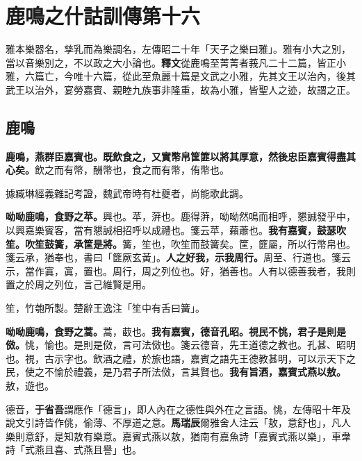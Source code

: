 \chapter{鹿鳴之什詁訓傳第十六}

\begin{quoting}雅本樂器名，孳乳而為樂調名，左傳昭二十年「天子之樂曰雅」。雅有小大之別，當以音樂別之，不以政之大小論也。\textbf{釋文}從鹿鳴至菁菁者莪凡二十二篇，皆正小雅，六篇亡，今唯十六篇，從此至魚麗十篇是文武之小雅，先其文王以治內，後其武王以治外，宴勞嘉賓、親睦九族事非隆重，故為小雅，皆聖人之迹，故謂之正。\end{quoting}

\section{鹿鳴}


\textbf{鹿鳴，燕群臣嘉賓也。既飲食之，又實幣帛筐篚以將其厚意，然後忠臣嘉賓得盡其心矣。}{\footnotesize 飲之而有幣，酬幣也，食之而有幣，侑幣也。}

\begin{quoting}據臧琳經義雜記考證，魏武帝時有杜夔者，尚能歌此調。\end{quoting}

\textbf{呦呦鹿鳴，食野之苹。}{\footnotesize 興也。苹，蓱也。鹿得蓱，呦呦然鳴而相呼，懇誠發乎中，以興嘉樂賓客，當有懇誠相招呼以成禮也。箋云苹，藾蕭也。}\textbf{我有嘉賓，鼓瑟吹笙。吹笙鼓簧，承筐是將。}{\footnotesize 簧，笙也，吹笙而鼓簧矣。筐，篚屬，所以行幣帛也。箋云承，猶奉也，書曰「篚厥玄黃」。}\textbf{人之好我，示我周行。}{\footnotesize 周至、行道也。箋云示，當作寘，寘，置也。周行，周之列位也。好，猶善也。人有以德善我者，我則置之於周之列位，言己維賢是用。}

\begin{quoting}笙，竹匏所製。楚辭王逸注「笙中有舌曰簧」。\end{quoting}

\textbf{呦呦鹿鳴，食野之蒿。}{\footnotesize 蒿，菣也。}\textbf{我有嘉賓，德音孔昭。視民不恌，君子是則是傚。}{\footnotesize 恌，愉也。是則是傚，言可法傚也。箋云德音，先王道德之教也。孔甚、昭明也。視，古示字也。飲酒之禮，於旅也語，嘉賓之語先王德教甚明，可以示天下之民，使之不愉於禮義，是乃君子所法傚，言其賢也。}\textbf{我有旨酒，嘉賓式燕以敖。}{\footnotesize 敖，遊也。}

\begin{quoting}德音，\textbf{于省吾}謂應作「德言」，即人內在之德性與外在之言語。恌，左傳昭十年及說文引詩皆作佻，偷薄、不厚道之意。\textbf{馬瑞辰}爾雅舍人注云「敖，意舒也」，凡人樂則意舒，是知敖有樂意。嘉賓式燕以敖，猶南有嘉魚詩「嘉賓式燕以樂」，車舝詩「式燕且喜、式燕且譽」也。\end{quoting}

